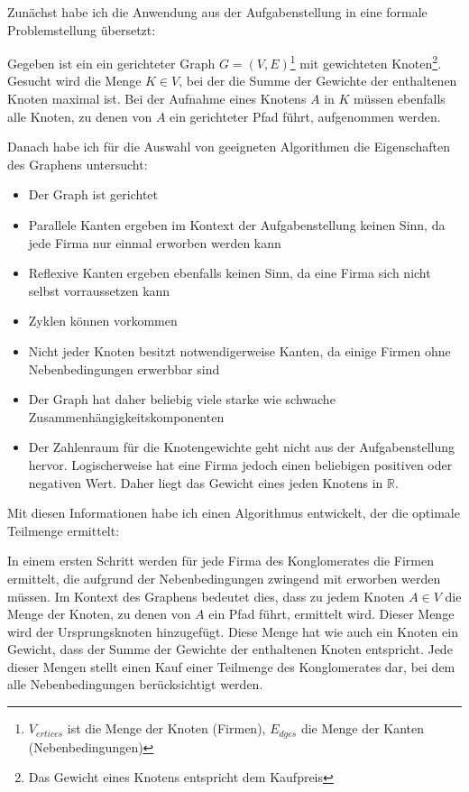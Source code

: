 Zunächst habe ich die Anwendung aus der Aufgabenstellung in eine formale Problemstellung übersetzt:
\begin{displayquote}
	Gegeben ist ein ein gerichteter Graph \(G=(V,E)\)\footnote{\(V_{ertices}\) ist die Menge der Knoten (Firmen), \(E_{dges}\) die Menge der Kanten (Nebenbedingungen)} mit gewichteten Knoten\footnote{Das Gewicht eines Knotens entspricht dem Kaufpreis}. Gesucht wird die Menge \(K \in V\), bei der die Summe der Gewichte der enthaltenen Knoten maximal ist. Bei der Aufnahme eines Knotens  \(A\) in \(K\) müssen ebenfalls alle Knoten, zu denen von \(A\) ein gerichteter Pfad führt, aufgenommen werden.
\end{displayquote}

Danach habe ich für die Auswahl von geeigneten Algorithmen die Eigenschaften des Graphens untersucht:
\begin{itemize}
	\item Der Graph ist gerichtet
	\item Parallele Kanten ergeben im Kontext der Aufgabenstellung keinen Sinn, da jede Firma nur einmal erworben werden kann
	\item Reflexive Kanten ergeben ebenfalls keinen Sinn, da eine Firma sich nicht selbst vorraussetzen kann
	\item Zyklen können vorkommen
	\item Nicht jeder Knoten besitzt notwendigerweise Kanten, da einige Firmen ohne Nebenbedingungen erwerbbar sind
	\item Der Graph hat daher beliebig viele starke wie schwache Zusammenhängigkeitskomponenten
	\item Der Zahlenraum für die Knotengewichte geht nicht aus der Aufgabenstellung hervor. Logischerweise hat eine Firma jedoch einen beliebigen positiven oder negativen Wert. Daher liegt das Gewicht eines jeden Knotens in \(\mathbb{R}\).
\end{itemize}

Mit diesen Informationen habe ich einen Algorithmus entwickelt, der die optimale Teilmenge ermittelt:

In einem ersten Schritt werden für jede Firma des Konglomerates die Firmen ermittelt, die aufgrund der Nebenbedingungen zwingend mit erworben werden müssen. Im Kontext des Graphens bedeutet dies, dass zu jedem Knoten \(A \in V\) die Menge der Knoten, zu denen von \(A\) ein Pfad führt, ermittelt wird. Dieser Menge wird der Ursprungsknoten hinzugefügt. Diese Menge hat wie auch ein Knoten ein Gewicht, dass der Summe der Gewichte der enthaltenen Knoten entspricht. Jede dieser Mengen stellt einen Kauf einer Teilmenge des Konglomerates dar, bei dem alle Nebenbedingungen berücksichtigt werden.

